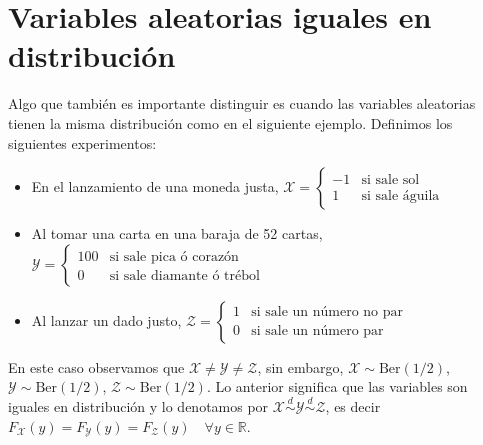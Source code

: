 \section{Variables aleatorias iguales en distribución}
Algo que también es importante distinguir es cuando las variables aleatorias tienen la misma distribución como en el siguiente ejemplo.
Definimos los siguientes experimentos:
\begin{itemize}
    \item En el lanzamiento de una moneda justa, $\mathcal X=\begin{cases}
        -1 & \text{si sale sol}\\
        1 & \text{si sale águila}
    \end{cases}$

    \item Al tomar una carta en una baraja de 52 cartas, $\mathcal Y=\begin{cases}
        100 & \text{si sale pica ó corazón}\\
        0 & \text{si sale diamante ó trébol}
    \end{cases}$

    \item Al lanzar un dado justo, $\mathcal Z=\begin{cases}
        1 & \text{si sale un número no par}\\
        0 & \text{si sale un número par}
    \end{cases}$
\end{itemize}
En este caso observamos que $\mathcal X \neq \mathcal Y \neq \mathcal Z$, sin embargo, $\mathcal X \sim \text{Ber}(1/2)$, $\mathcal Y \sim \text{Ber}(1/2)$, $\mathcal Z \sim \text{Ber}(1/2)$. Lo anterior significa que las variables son iguales en distribución y lo denotamos por $\mathcal X \stackrel{d}{\sim} \mathcal Y \stackrel{d}{\sim} \mathcal Z$, es decir $F_\mathcal X(y)=F_\mathcal Y(y)=F_\mathcal Z(y) \quad \forall y \in \mathbb{R}$.



